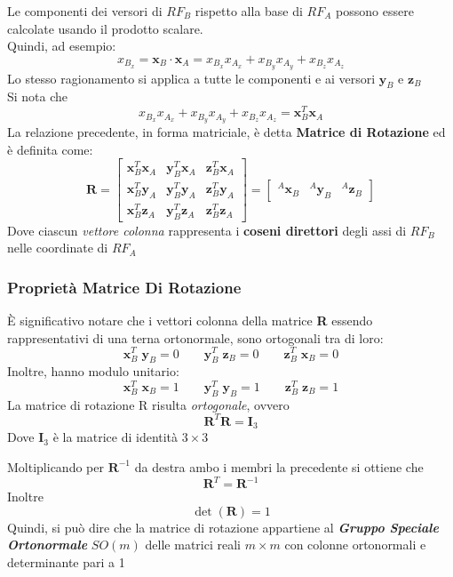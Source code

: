 ﻿\documentclass[11pt, a4paper]{article}
\begin{document}
Le componenti dei versori di $ RF_B $ rispetto alla base di $ RF_A $ possono essere calcolate usando il prodotto scalare.\\
Quindi, ad esempio:
\[
    x_{B_x} = \mathbf{x}_B \cdot \mathbf{x}_A = x_{B_{x}}x_{A_{x}} + x_{B_{y}}x_{A_{y}} + x_{B_{z}}x_{A_{z}}
\]
Lo stesso ragionamento si applica a tutte le componenti e ai versori $ \mathbf{y}_B $ e $ \mathbf{z}_B $\\
Si nota che
\[
    x_{B_{x}}x_{A_{x}} + x_{B_{y}}x_{A_{y}} + x_{B_{z}}x_{A_{z}} = \mathbf{x}_B^{T}\mathbf{x}_A
\]
La relazione precedente, in forma matriciale, è detta \textbf{Matrice di Rotazione} ed è definita come:
\[
    \mathbf{R} =
    \begin{bmatrix}
        \mathbf{x}_B^{T}\mathbf{x}_A & \mathbf{y}_B^{T}\mathbf{x}_A & \mathbf{z}_B^{T}\mathbf{x}_A\\
        \mathbf{x}_B^{T}\mathbf{y}_A & \mathbf{y}_B^{T}\mathbf{y}_A & \mathbf{z}_B^{T}\mathbf{y}_A\\
        \mathbf{x}_B^{T}\mathbf{z}_A & \mathbf{y}_B^{T}\mathbf{z}_A & \mathbf{z}_B^{T}\mathbf{z}_A
    \end{bmatrix}
    =
    \begin{bmatrix}
        ^{A}\mathbf{x}_{B} & ^{A}\mathbf{y}_{B} & ^{A}\mathbf{z}_{B}
    \end{bmatrix}
\]
Dove ciascun \textit{vettore colonna} rappresenta i \textbf{coseni direttori} degli assi di \(RF_{B}\) nelle coordinate di \(RF_{A}\)
\subsubsection{Proprietà Matrice Di Rotazione}
È significativo notare che i vettori colonna della matrice \textbf{R} essendo rappresentativi di una terna ortonormale, sono ortogonali tra di loro:
\[
    \mathbf{x}_{B}^{T} \; \mathbf{y}_{B} = 0 \qquad \mathbf{y}_{B}^{T} \; \mathbf{z}_{B} = 0 \qquad \mathbf{z}_{B}^{T} \; \mathbf{x}_{B} = 0
\]
Inoltre, hanno modulo unitario:
\[
    \mathbf{x}_{B}^{T} \; \mathbf{x}_{B} = 1 \qquad \mathbf{y}_{B}^{T} \; \mathbf{y}_{B} = 1 \qquad \mathbf{z}_{B}^{T} \; \mathbf{z}_{B} = 1
\]
La matrice di rotazione R risulta \textit{ortogonale}, ovvero
\[
    \mathbf{R}^{T}\mathbf{R} = \mathbf{I}_{3}
\]
Dove $\mathbf{I}_{3}$ è la matrice di identità $3 \times 3$

Moltiplicando per $\mathbf{R}^{-1}$ da destra ambo i membri la precedente si ottiene che
\[
    \mathbf{R}^{T} = \mathbf{R}^{-1}
\]
Inoltre
\[
    \det(\mathbf{R}) = 1
\]
Quindi, si può dire che la matrice di rotazione appartiene al \textbf{\textit{Gruppo Speciale Ortonormale}} $SO(m)$ delle matrici reali $ m \times m$ con colonne ortonormali e determinante pari a 1
\newpage
\end{document}
